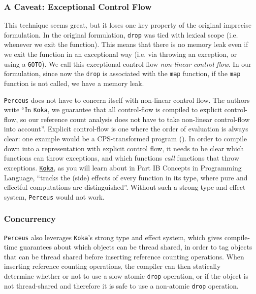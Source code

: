 \subsubsection{A Caveat: Exceptional Control Flow}
This technique seems great, but it loses one key property of the original imprecise formulation. In the original formulation, \texttt{drop} was tied with lexical scope (i.e. whenever we exit the function). This means that there is no memory leak even if we exit the function in an exceptional way (i.e. via throwing an exception, or using a \texttt{GOTO}). We call this exceptional control flow \textit{non-linear control flow}. In our formulation, since now the \texttt{drop} is associated with the \texttt{map} function, if the \texttt{map} function is not called, we have a memory leak. 

\texttt{Perceus} does not have to concern itself with non-linear control flow. The authors write ``In \texttt{Koka}, we guarantee that all control-flow is compiled to explicit control-flow, so our reference count analysis does not have to take non-linear control-flow into account''. Explicit control-flow is one where the order of evaluation is always clear: one example would be a CPS-transformed program (). In order to compile down into a representation with explicit control flow, it needs to be clear which functions can throw exceptions, and which functions \textit{call} functions that throw exceptions. \href{https://koka-lang.github.io/koka/doc/index.html}{\texttt{Koka}}, as you will learn about in \textsf{Part IB Concepts in Programming Language}, ``tracks the (side) effects of every function in its type, where pure and effectful computations are distinguished''. Without such a strong type and effect system, \texttt{Perceus} would not work.

\subsubsection{Concurrency}
\texttt{Perceus} also leverages \texttt{Koka}'s strong type and effect system, which gives compile-time guarantees about which objects can be thread shared, in order to tag objects that can be thread shared before inserting reference counting operations. When inserting reference counting operations, the compiler can then statically determine whether or not to use a slow atomic \texttt{drop} operation, or if the object is not thread-shared and therefore it is safe to use a non-atomic \texttt{drop} operation. 

